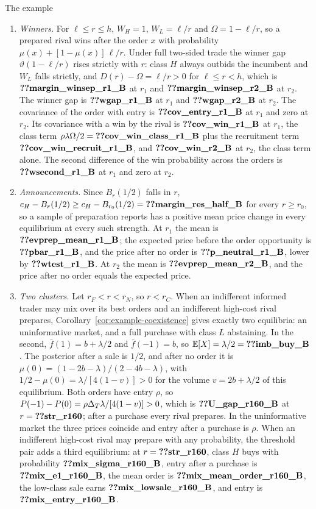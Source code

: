 \begin{named}{The example}
\begin{enumerate}[label=(\alph*),leftmargin=2em]
\item \emph{Winners.} For \(\ell\le r\le h\), \(W_H=1\), \(W_L=\ell/r\) and \(\Omega=1-\ell/r\), so a prepared
rival wins after the order \(x\) with probability \(\mu(x)+[1-\mu(x)]\,\ell/r\). Under full two-sided trade the
winner gap \(\vartheta(1-\ell/r)\) rises strictly with \(r\): class \(H\) always outbids the incumbent and \(W_L\)
falls strictly, and \(D(r)-\Omega=\ell/r>0\) for \(\ell\le r<h\), which is \(\reg{margin_winsep_r1_B}\) at \(r_1\) and
\(\reg{margin_winsep_r2_B}\) at \(r_2\). The winner gap is \(\reg{wgap_r1_B}\) at \(r_1\) and \(\reg{wgap_r2_B}\) at
\(r_2\). The covariance of the order with entry is \(\reg{cov_entry_r1_B}\) at \(r_1\) and zero at \(r_2\). Its
covariance with a win by the rival is \(\reg{cov_win_r1_B}\) at \(r_1\), the class term
\(\rho\lambda\Omega/2=\reg{cov_win_class_r1_B}\) plus the recruitment term \(\reg{cov_win_recruit_r1_B}\), and
\(\reg{cov_win_r2_B}\) at \(r_2\), the class term alone. The second difference of the win probability across the
orders is \(\reg{wsecond_r1_B}\) at \(r_1\) and zero at \(r_2\).
\item \emph{Announcements.} Since \(B_r(1/2)\) falls in \(r\), \(c_H-B_r(1/2)\ge c_H-B_{r_0}(1/2)=\reg{margin_res_half_B}\)
for every \(r\ge r_0\), so a sample of preparation reports has a positive mean price change in every equilibrium at
every such strength. At \(r_1\) the mean is \(\reg{evprep_mean_r1_B}\); the expected price before the order
opportunity is \(\reg{pbar_r1_B}\), and the price after no order is \(\reg{p_neutral_r1_B}\), lower by
\(\reg{wtest_r1_B}\). At \(r_2\) the mean is \(\reg{evprep_mean_r2_B}\), and the price after no order equals the
expected price.
\item \emph{Two clusters.} Let \(r_F<r<r_N\), so \(r<r_C\). When an indifferent informed trader may mix over its best orders
and an indifferent high-cost rival prepares, Corollary~\ref{cor:example-coexistence} gives exactly two equilibria: an
uninformative market, and a full purchase with class \(L\) abstaining. In the second, \(\bar f(1)=b+\lambda/2\) and
\(\bar f(-1)=b\), so \(\E[X]=\lambda/2=\reg{imb_buy_B}\). The posterior after a sale is \(1/2\), and after no order it
is \(\mu(0)=(1-2b-\lambda)/(2-4b-\lambda)\), with \(1/2-\mu(0)=\lambda/[4(1-v)]>0\) for the volume \(v=2b+\lambda/2\)
of this equilibrium. Both orders have entry \(\rho\), so \(P(-1)-P(0)=\rho\Delta_T\lambda/[4(1-v)]>0\), which is
\(\reg{U_gap_r160_B}\) at \(r=\reg{str_r160}\); after a purchase every rival prepares. In the uninformative market the
three prices coincide and entry after a purchase is \(\rho\). When an indifferent high-cost rival may prepare
with any probability, the threshold pair adds a third equilibrium: at \(r=\reg{str_r160}\), class \(H\) buys with
probability \(\reg{mix_sigma_r160_B}\), entry after a purchase is \(\reg{mix_e1_r160_B}\), the mean order is
\(\reg{mix_mean_order_r160_B}\), the low-class sale earns \(\reg{mix_lowsale_r160_B}\), and entry is
\(\reg{mix_entry_r160_B}\).
\end{enumerate}
\end{named}

